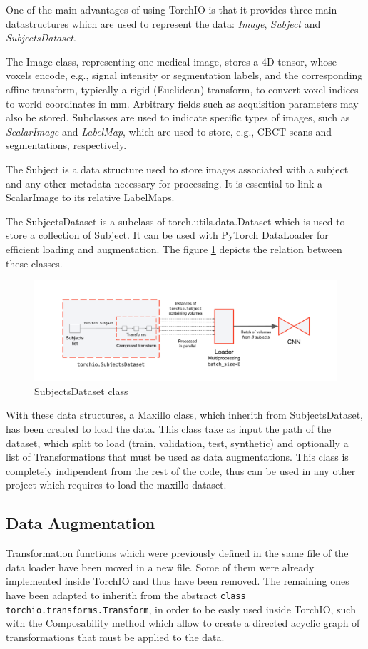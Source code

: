 One of the main advantages of using TorchIO is that it provides three main
datastructures which are used to represent the data: \emph{Image},
\emph{Subject} and \emph{SubjectsDataset}.

The Image class, representing one medical image, stores a 4D tensor, whose
voxels encode, e.g., signal intensity or segmentation labels, and the
corresponding affine transform, typically a rigid (Euclidean) transform, to
convert voxel indices to world coordinates in mm. Arbitrary fields such as
acquisition parameters may also be stored. Subclasses are used to indicate
specific types of images, such as \emph{ScalarImage} and \emph{LabelMap}, which
are used to store, e.g., CBCT scans and segmentations, respectively.

The Subject is a data structure used to store images associated with a subject
and any other metadata necessary for processing. It is essential to link a
ScalarImage to its relative LabelMaps.

The SubjectsDataset is a subclass of torch.utils.data.Dataset which is used to
store a collection of Subject. It can be used with PyTorch DataLoader for
efficient loading and augmentation. The figure \ref{fig:subjectsdataset}
depicts the relation between these classes.
\begin{figure}[h]
  \centering
  \includegraphics[width=0.8\linewidth]{Images/subjectsdataset.png}
  \caption{SubjectsDataset class}
  \label{fig:subjectsdataset}
\end{figure}
With these data structures, a Maxillo class, which inherith from
SubjectsDataset, has been created to load the data. This class take as input the
path of the dataset, which split to load (train, validation, test, synthetic)
and optionally a list of Transformations that must be used as data
augmentations. This class is completely indipendent from the rest of the code,
thus can be used in any other project which requires to load the maxillo
dataset.

\subsection{Data Augmentation}
Transformation functions which were previously defined in the same file of the
data loader have been moved in a new file. Some of them were already implemented
inside TorchIO and thus have been removed. The remaining ones have been adapted
to inherith from the abstract \texttt{class torchio.transforms.Transform}, in
order to be easly used inside TorchIO, such with the Composability method which
allow to create a directed acyclic graph of transformations that must be applied
to the data.




